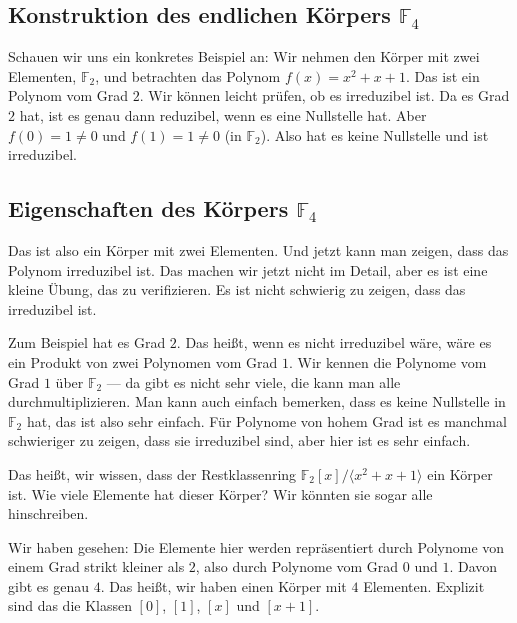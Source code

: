 \subsection{Konstruktion des endlichen Körpers \texorpdfstring{$\mathbb{F}_4$}{F4}}

\begin{spoken-clean}[00:57:19 - 00:57:34]
Schauen wir uns ein konkretes Beispiel an: Wir nehmen den Körper mit zwei Elementen, $\mathbb{F}_2$, und betrachten das Polynom $f(x) = x^2 + x + 1$. Das ist ein Polynom vom Grad $2$. Wir können leicht prüfen, ob es irreduzibel ist. Da es Grad $2$ hat, ist es genau dann reduzibel, wenn es eine Nullstelle hat. Aber $f(0) = 1 \neq 0$ und $f(1) = 1 \neq 0$ (in $\mathbb{F}_2$). Also hat es keine Nullstelle und ist irreduzibel.
\end{spoken-clean}

\subsection{Eigenschaften des Körpers \texorpdfstring{$\mathbb{F}_4$}{F4}}

\begin{spoken-clean}[00:57:34 - 00:58:57]
Das ist also ein Körper mit zwei Elementen. Und jetzt kann man zeigen, dass das Polynom irreduzibel ist. Das machen wir jetzt nicht im Detail, aber es ist eine kleine Übung, das zu verifizieren. Es ist nicht schwierig zu zeigen, dass das irreduzibel ist.

Zum Beispiel hat es Grad $2$. Das heißt, wenn es nicht irreduzibel wäre, wäre es ein Produkt von zwei Polynomen vom Grad $1$. Wir kennen die Polynome vom Grad $1$ über $\mathbb{F}_2$ --- da gibt es nicht sehr viele, die kann man alle durchmultiplizieren. Man kann auch einfach bemerken, dass es keine Nullstelle in $\mathbb{F}_2$ hat, das ist also sehr einfach. Für Polynome von hohem Grad ist es manchmal schwieriger zu zeigen, dass sie irreduzibel sind, aber hier ist es sehr einfach.
\end{spoken-clean}

\begin{spoken-clean}[00:58:57 - 01:00:12]
Das heißt, wir wissen, dass der Restklassenring $\mathbb{F}_2[x]/\langle x^2 + x + 1 \rangle$ ein Körper ist. Wie viele Elemente hat dieser Körper? Wir könnten sie sogar alle hinschreiben.

Wir haben gesehen: Die Elemente hier werden repräsentiert durch Polynome von einem Grad strikt kleiner als $2$, also durch Polynome vom Grad $0$ und $1$. Davon gibt es genau $4$. Das heißt, wir haben einen Körper mit $4$ Elementen. Explizit sind das die Klassen $[0]$, $[1]$, $[x]$ und $[x+1]$.
\end{spoken-clean}

